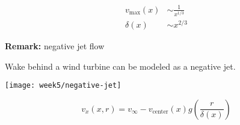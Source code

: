 \begin{align}
v_\mathrm{max}(x)&\sim\frac{1}{x^{1/3}}\\
\delta(x)&\sim x^{2/3}
\end{align}

\begin{framed}
\textbf{Remark:} negative jet flow

Wake behind a wind turbine can be modeled as a negative jet.

{\center
\texttt{[image: week5/negative-jet]}\\
}

\begin{equation}
v_x(x,r) = v_\infty-v_\mathrm{center}(x)g\left(\frac{r}{\delta(x)}\right)
\end{equation}
\end{framed}